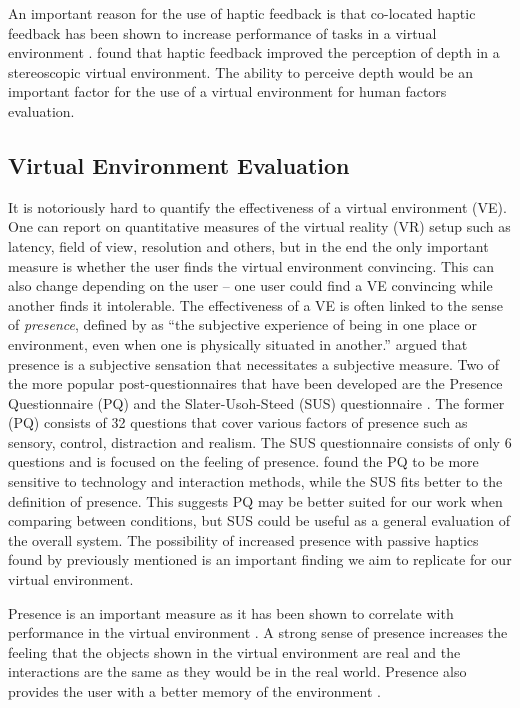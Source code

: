 An important reason for the use of haptic feedback is that co-located haptic feedback has been shown to increase performance of tasks in a virtual environment \citep{swapp_interaction_2006}.
\citet{bouguila_effect_2000} found that haptic feedback improved the perception of depth in a stereoscopic virtual environment.
The ability to perceive depth would be an important factor for the use of a virtual environment for human factors evaluation.

\subsection{Virtual Environment Evaluation}
\label{virtual-environment-evaluation}

It is notoriously hard to quantify the effectiveness of a virtual environment (VE).
One can report on quantitative measures of the virtual reality (VR) setup such as latency, field of view, resolution and others, but in the end the only important measure is whether the user finds the virtual environment convincing.
This can also change depending on the user -- one user could find a VE convincing while another finds it intolerable.
The effectiveness of a VE is often linked to the sense of \emph{presence}, defined by \citet{witmer_measuring_1998} as ``the subjective experience of being in one place or environment, even when one is physically situated in another.''
\citet{sheridan_musings_1992} argued that presence is a subjective sensation that necessitates a subjective measure.
Two of the more popular post-questionnaires that have been developed are the Presence Questionnaire (PQ) \citep{witmer_measuring_1998} and the Slater-Usoh-Steed (SUS) questionnaire \citep{slater_depth_1994}.
The former (PQ) consists of 32 questions that cover various factors of presence such as sensory, control, distraction and realism.
The SUS questionnaire consists of only 6 questions and is focused on the feeling of presence.
\citet{nystad_comparison_2004} found the PQ to be more sensitive to technology and interaction methods, while the SUS fits better to the definition of presence.
This suggests PQ may be better suited for our work when comparing between conditions, but SUS could be useful as a general evaluation of the overall system.
The possibility of increased presence with passive haptics found by \citet{insko_passive_2001} previously mentioned is an important finding we aim to replicate for our virtual environment.

Presence is an important measure as it has been shown to correlate with performance in the virtual environment \citep{youngblut_relationship_2003}.
A strong sense of presence increases the feeling that the objects shown in the virtual environment are real and the interactions are the same as they would be in the real world.
Presence also provides the user with a better memory of the environment \citep{dinh_evaluating_1999}.

